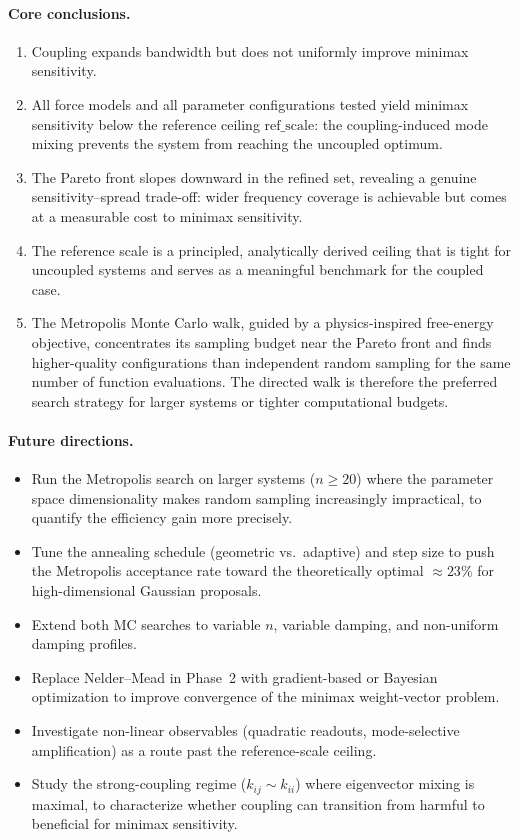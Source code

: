 \documentclass[11pt, letterpaper]{article}
\newcommand{\refscale}{\mathrm{ref\_scale}}
\begin{document}
\paragraph{Core conclusions.}
\begin{enumerate}[noitemsep]
  \item Coupling expands bandwidth but does not uniformly improve minimax
        sensitivity.
  \item All force models and all parameter configurations tested yield
        minimax sensitivity below the reference ceiling $\refscale$: the
        coupling-induced mode mixing prevents the system from reaching the
        uncoupled optimum.
  \item The Pareto front slopes downward in the refined set, revealing a
        genuine sensitivity--spread trade-off: wider frequency coverage is
        achievable but comes at a measurable cost to minimax sensitivity.
  \item The reference scale is a principled, analytically derived ceiling
        that is tight for uncoupled systems and serves as a meaningful
        benchmark for the coupled case.
  \item The Metropolis Monte Carlo walk, guided by a physics-inspired
        free-energy objective, concentrates its sampling budget near the
        Pareto front and finds higher-quality configurations than independent
        random sampling for the same number of function evaluations.  The
        directed walk is therefore the preferred search strategy for larger
        systems or tighter computational budgets.
\end{enumerate}

\paragraph{Future directions.}
\begin{itemize}[noitemsep]
  \item Run the Metropolis search on larger systems ($n \geq 20$) where the
        parameter space dimensionality makes random sampling increasingly
        impractical, to quantify the efficiency gain more precisely.
  \item Tune the annealing schedule (geometric vs.\ adaptive) and step size
        to push the Metropolis acceptance rate toward the theoretically optimal
        $\approx 23\%$ for high-dimensional Gaussian proposals.
  \item Extend both MC searches to variable $n$, variable damping, and
        non-uniform damping profiles.
  \item Replace Nelder--Mead in Phase~2 with gradient-based or Bayesian
        optimization to improve convergence of the minimax weight-vector
        problem.
  \item Investigate non-linear observables (quadratic readouts, mode-selective
        amplification) as a route past the reference-scale ceiling.
  \item Study the strong-coupling regime ($k_{ij} \sim k_{ii}$) where
        eigenvector mixing is maximal, to characterize whether coupling can
        transition from harmful to beneficial for minimax sensitivity.
\end{itemize}
\end{document}
